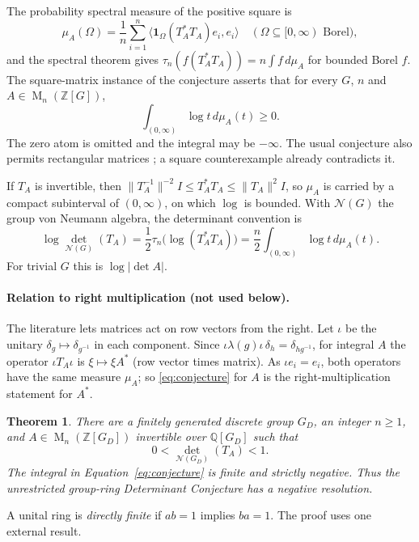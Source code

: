 \documentclass[11pt]{article}
\newtheorem{theorem}{Theorem}[section]
\theoremstyle{remark}
\numberwithin{equation}{section}
\newcommand{\Z}{\mathbb Z}
\newcommand{\Q}{\mathbb Q}
\newcommand{\Mat}{\operatorname{M}}
\newcommand{\N}{\mathcal N}
\begin{document}
The probability spectral measure of the positive square is
\[
 \mu_A(\Omega)=\frac1n\sum_{i=1}^n\langle\mathbf1_\Omega(T_A^*T_A)e_i,e_i\rangle
 \quad(\Omega\subseteq[0,\infty)\text{ Borel}),
\]
and the spectral theorem gives $\tau_n(f(T_A^*T_A))=n\int f\,d\mu_A$ for bounded Borel $f$. The square-matrix instance of the conjecture asserts that for every $G$, $n$ and $A\in\Mat_n(\Z[G])$,
\begin{equation}\label{eq:conjecture}
 \int_{(0,\infty)}\log t\,d\mu_A(t)\ge0.
\end{equation}
The zero atom is omitted and the integral may be $-\infty$. The usual conjecture also permits rectangular matrices \cite[Conjecture 13.2]{Luck2002}; a square counterexample already contradicts it.

If $T_A$ is invertible, then $\|T_A^{-1}\|^{-2}I\le T_A^*T_A\le\|T_A\|^2I$, so $\mu_A$ is carried by a compact subinterval of $(0,\infty)$, on which $\log$ is bounded. With $\N(G)$ the group von Neumann algebra, the determinant convention is
\begin{equation}\label{eq:normalization}
 \log\det_{\N(G)}(T_A)=\frac12\tau_n\bigl(\log(T_A^*T_A)\bigr)
 =\frac n2\int_{(0,\infty)}\log t\,d\mu_A(t).
\end{equation}
For trivial $G$ this is $\log|\det A|$.

\paragraph{Relation to right multiplication (not used below).}
The literature lets matrices act on row vectors from the right. Let $\iota$ be the unitary $\delta_g\mapsto\delta_{g^{-1}}$ in each component. Since $\iota\lambda(g)\iota\,\delta_h=\delta_{hg^{-1}}$, for integral $A$ the operator $\iota T_A\iota$ is $\xi\mapsto\xi A^*$ (row vector times matrix). As $\iota e_i=e_i$, both operators have the same measure $\mu_A$; so \eqref{eq:conjecture} for $A$ is the right-multiplication statement for $A^*$.

\begin{theorem}\label{thm:main}
There are a finitely generated discrete group $G_D$, an integer $n\ge1$, and $A\in\Mat_n(\Z[G_D])$ invertible over $\Q[G_D]$ such that
\[
 0<\det_{\N(G_D)}(T_A)<1.
\]
The integral in Equation~\eqref{eq:conjecture} is finite and strictly negative. Thus the unrestricted group-ring Determinant Conjecture has a negative resolution.
\end{theorem}

A unital ring is \emph{directly finite} if $ab=1$ implies $ba=1$. The proof uses one external result.
\end{document}
